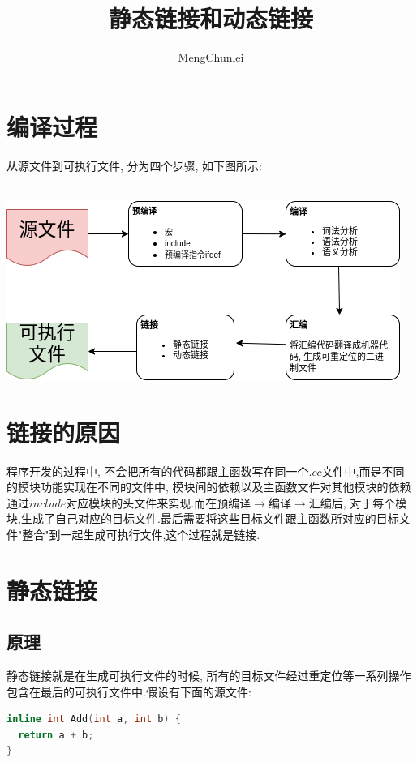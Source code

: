 \documentclass{article}
\title{静态链接和动态链接}
\author{MengChunlei}
\begin{document}
\maketitle
\section{编译过程}
从源文件到可执行文件, 分为四个步骤, 如下图所示: \par
~\\
\includegraphics[scale=0.8]{pic1.png} \par
\section{链接的原因}
程序开发的过程中, 不会把所有的代码都跟主函数写在同一个$.cc$文件中,而是不同的模块功能实现在不同的文件中, 模块间的依赖以及主函数文件对其他模块的依赖通过$include$对应模块的头文件来实现.而在预编译$\rightarrow$编译$\rightarrow$汇编后, 对于每个模块,生成了自己对应的目标文件.最后需要将这些目标文件跟主函数所对应的目标文件"整合"到一起生成可执行文件,这个过程就是链接.
\section{静态链接}
\subsection{原理} 
静态链接就是在生成可执行文件的时候, 所有的目标文件经过重定位等一系列操作包含在最后的可执行文件中.假设有下面的源文件: \par

\begin{lstlisting}[language=C++, caption={hello.h}]
inline int Add(int a, int b) {
  return a + b;
}
\end{lstlisting}
\end{document}
